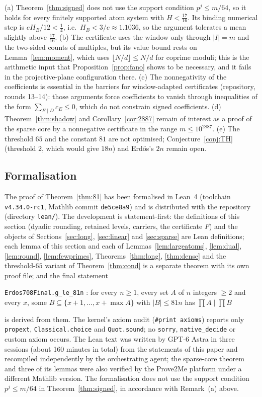 \begin{remark}
(a) Theorem~\ref{thm:signed} does not use the support condition $p^j\le m/64$, so it holds for every finitely supported atom system
with $H<\tfrac{17}{16}$. Its binding numerical step is $eH_B/12<\tfrac14$, i.e.\ $H_B<3/e\approx1.1036$, so the argument tolerates a mean
slightly above $\tfrac{17}{16}$.
(b) The certificate uses the window only through $|I|=m$ and the two-sided counts of multiples, but its value bound rests on
Lemma~\ref{lem:moment}, which uses $\lfloor N/d\rfloor\le N/d$ for coprime moduli; this is the arithmetic input that
Proposition~\ref{prop:fano} shows to be necessary, and it fails in the projective-plane configuration there.
(c) The nonnegativity of the coefficients is essential in the barriers for window-adapted certificates (repository, rounds 13--14):
those arguments force coefficients to vanish through inequalities of the form $\sum_{E\mid D}c_E\le0$, which do not constrain signed
coefficients.
(d) Theorem~\ref{thm:shadow} and Corollary~\ref{cor:2887} remain of interest as a proof of the sparse core by a nonnegative
certificate in the range $m\le10^{2887}$.
(e) The threshold $65$ and the constant $81$ are not optimised; Conjecture~\ref{conj:TH} (threshold $2$, which would give $18n$) and
Erd\H{o}s's $2n$ remain open.
\end{remark}

\subsection*{Formalisation}

The proof of Theorem~\ref{thm:81} has been formalised in Lean~4 (toolchain \texttt{v4.34.0-rc1}, Mathlib commit
\texttt{de5ce8a9}) and is distributed with the repository (directory \texttt{lean/}). The development is statement-first:
the definitions of this section (dyadic rounding, retained levels, carriers, the certificate $F$) and the objects of
Sections~\ref{sec:long}, \ref{sec:linear} and \ref{sec:sparse} are Lean definitions; each lemma of this section and each
of Lemmas~\ref{lem:largeatoms}, \ref{lem:dual}, \ref{lem:round}, \ref{lem:fewprimes}, Theorems~\ref{thm:long},
\ref{thm:dense} and the threshold-$65$ variant of Theorem~\ref{thm:cond} is a separate theorem with its own proof file;
and the final statement
\begin{center}
\texttt{Erdos708Final.g\_le\_81n} : for every $n\ge1$, every set $A$ of $n$ integers $\ge2$ and every $x$, some
$B\subseteq\{x+1,\dots,x+\max A\}$ with $|B|\le81n$ has $\prod A\mid\prod B$
\end{center}
is derived from them. The kernel's axiom audit (\texttt{\#print axioms}) reports only \texttt{propext},
\texttt{Classical.choice} and \texttt{Quot.sound}; no \texttt{sorry}, \texttt{native\_decide} or custom axiom occurs.
The Lean text was written by GPT-6 Astra in three sessions (about 160 minutes in total) from the statements of this paper and
recompiled independently by the orchestrating agent; the sparse-core theorem and three of its lemmas were also verified by the
Prove2Me platform under a different Mathlib version. The formalisation does not use the support condition $p^j\le m/64$ in
Theorem~\ref{thm:signed}, in accordance with Remark~(a) above.
